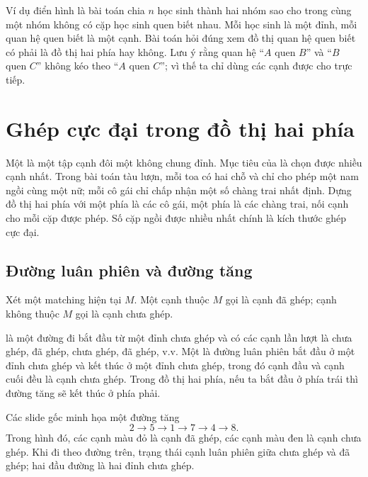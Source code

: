 \documentclass[11pt]{article}
\begin{document}
Ví dụ điển hình là bài toán chia $n$ học sinh thành hai nhóm sao cho trong cùng
một nhóm không có cặp học sinh quen biết nhau. Mỗi học sinh là một đỉnh, mỗi
quan hệ quen biết là một cạnh. Bài toán hỏi đúng xem đồ thị quan hệ quen biết
có phải là đồ thị hai phía hay không. Lưu ý rằng quan hệ ``$A$ quen $B$'' và
``$B$ quen $C$'' không kéo theo ``$A$ quen $C$''; vì thế ta chỉ dùng các cạnh
được cho trực tiếp.

\section{Ghép cực đại trong đồ thị hai phía}

Một  là một tập cạnh đôi một không chung đỉnh. Mục tiêu của
 là chọn được nhiều cạnh nhất. Trong bài toán tàu lượn, mỗi
toa có hai chỗ và chỉ cho phép một nam ngồi cùng một nữ; mỗi cô gái chỉ chấp
nhận một số chàng trai nhất định. Dựng đồ thị hai phía với một phía là các cô
gái, một phía là các chàng trai, nối cạnh cho mỗi cặp được phép. Số cặp ngồi
được nhiều nhất chính là kích thước ghép cực đại.

\subsection{Đường luân phiên và đường tăng}

Xét một matching hiện tại $M$. Một cạnh thuộc $M$ gọi là cạnh đã ghép; cạnh
không thuộc $M$ gọi là cạnh chưa ghép.

 là một đường đi bắt đầu từ một đỉnh chưa ghép và có các
cạnh lần lượt là chưa ghép, đã ghép, chưa ghép, đã ghép, v.v. Một
 là đường luân phiên bắt đầu ở một đỉnh chưa ghép và kết thúc
ở một đỉnh chưa ghép, trong đó cạnh đầu và cạnh cuối đều là cạnh chưa ghép.
Trong đồ thị hai phía, nếu ta bắt đầu ở phía trái thì đường tăng sẽ kết thúc ở
phía phải.

Các slide gốc minh họa một đường tăng
\[
  2\to 5\to 1\to 7\to 4\to 8.
\]
Trong hình đó, các cạnh màu đỏ là cạnh đã ghép, các cạnh màu đen là cạnh chưa
ghép. Khi đi theo đường trên, trạng thái cạnh luân phiên giữa chưa ghép và đã
ghép; hai đầu đường là hai đỉnh chưa ghép.
\end{document}
